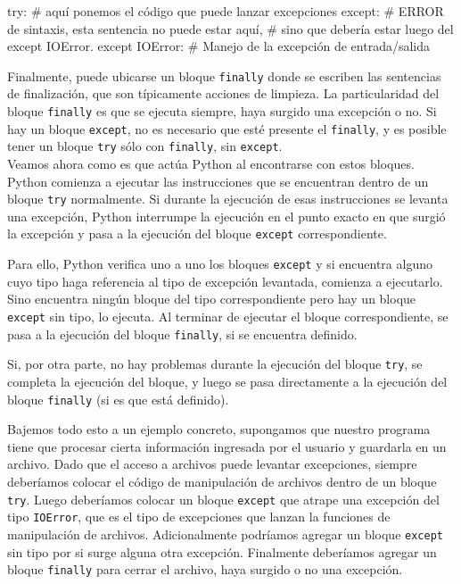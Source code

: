 \begin{codigo-python-sn}[numbers=none]
try:
	# aquí ponemos el código que puede lanzar excepciones
except:
	# ERROR de sintaxis, esta sentencia no puede estar aquí,
	# sino que debería estar luego del except IOError.
except IOError:
	# Manejo de la excepción de entrada/salida
\end{codigo-python-sn}

Finalmente, puede ubicarse un bloque \lstinline!finally! donde se escriben
las sentencias de finalización, que son típicamente acciones de limpieza.
La particularidad del bloque \lstinline!finally! es que se ejecuta siempre,
haya surgido una excepción o no. Si hay un bloque \lstinline!except!, no es
necesario que esté presente el \lstinline!finally!, y es posible tener un
bloque \lstinline!try! sólo con \lstinline!finally!, sin
\lstinline!except!. \\

Veamos ahora como es que actúa Python al encontrarse con estos bloques. Python
comienza a ejecutar las instrucciones que se encuentran dentro de un bloque
\lstinline!try! normalmente. Si durante la ejecución de esas instrucciones
se levanta una excepción, Python interrumpe la ejecución en el
punto exacto en que surgió la excepción y pasa a la ejecución del bloque
\lstinline!except! correspondiente.

Para ello, Python verifica uno a uno los bloques \lstinline!except! y si
encuentra alguno cuyo tipo haga referencia al tipo de excepción levantada,
comienza a ejecutarlo. Sino encuentra ningún bloque del tipo
correspondiente pero hay un bloque \lstinline!except! sin tipo, lo
ejecuta. Al terminar de ejecutar el bloque correspondiente, se pasa a la
ejecución del bloque \lstinline!finally!, si se encuentra definido.

Si, por otra parte, no hay problemas durante la ejecución del bloque
\lstinline!try!, se completa la ejecución del bloque, y luego se pasa
directamente a la ejecución del bloque \lstinline!finally! (si es que está
definido). 

Bajemos todo esto a un ejemplo concreto, supongamos que nuestro programa
tiene que procesar cierta información ingresada por el usuario y guardarla
en un archivo. Dado que el acceso a archivos puede levantar
excepciones, siempre deberíamos colocar el código de manipulación de
archivos dentro de un bloque \lstinline!try!. Luego deberíamos
colocar un bloque \lstinline!except! que atrape una excepción del tipo
\lstinline!IOError!, que es el tipo de excepciones que lanzan la funciones
de manipulación de archivos. Adicionalmente podríamos agregar un bloque
\lstinline!except! sin tipo por si surge alguna otra excepción.  Finalmente
deberíamos agregar un bloque \lstinline!finally! para cerrar el archivo,
haya surgido o no una excepción.

